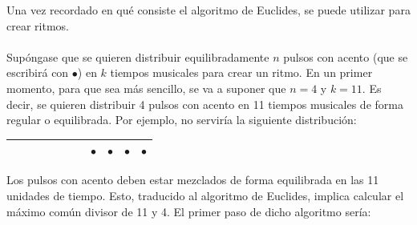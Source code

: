 \documentclass[a4paper, openright, 11pt, titlepage]{report}
\theoremstyle{definition}\newtheorem{defin}[propo]{Definition}
\theoremstyle{definition}\newtheorem{obser}[propo]{Remark}
\theoremstyle{definition}\newtheorem{ejem}[propo]{Ejemplo}
\theoremstyle{definition}\newtheorem{algoritmo}[propo]{Algoritmo}
\begin{document}
Una vez recordado en qué consiste el algoritmo de Euclides, se puede utilizar para crear ritmos.\\\\
Supóngase que se quieren distribuir equilibradamente $n$ pulsos con acento (que se escribirá con $\bullet$) en $k$ tiempos musicales para crear un ritmo. En un primer momento, para que sea más sencillo, se va a suponer que $n = 4$ y $k = 11$. Es decir, se quieren distribuir 4 pulsos con acento en 11 tiempos musicales de forma regular o equilibrada. Por ejemplo, no serviría la siguiente distribución:
\begin{table}[H]
    \centering
    \begin{tabular}{|c|c|c|c|c|c|c|c|c|c|c|}
    \hline
         & & & & & & & $\bullet$ & $\bullet$ & $\bullet$ & $\bullet$ \\
        \hline
    \end{tabular}
\end{table}
Los pulsos con acento deben estar mezclados de forma equilibrada en las 11 unidades de tiempo. Esto, traducido al algoritmo de Euclides, implica calcular el máximo común divisor de 11 y 4. El primer paso de dicho algoritmo sería:
\end{document}
